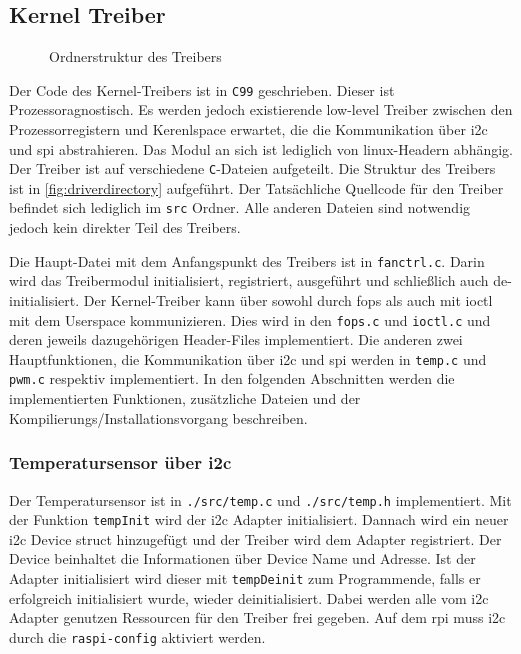 \subsection{Kernel Treiber}

\begin{wrapfigure}[23]{o}[1cm]{8cm}
\caption{Ordnerstruktur des Treibers}
\label{fig:driverdirectory}
\end{wrapfigure}

Der Code des Kernel-Treibers ist in \texttt{C99} geschrieben.
Dieser ist Prozessoragnostisch.
Es werden jedoch existierende low-level Treiber zwischen den Prozessorregistern und Kerenlspace erwartet, die die Kommunikation über \gls{i2c} und \gls{spi} abstrahieren.
Das Modul an sich ist lediglich von linux-Headern abhängig.
Der Treiber ist auf verschiedene \texttt{C}-Dateien aufgeteilt.
Die Struktur des Treibers ist in \autoref{fig:driverdirectory} aufgeführt.
Der Tatsächliche Quellcode für den Treiber befindet sich lediglich im \texttt{src} Ordner.
Alle anderen Dateien sind notwendig jedoch kein direkter Teil des Treibers.

Die Haupt-Datei mit dem Anfangspunkt des Treibers ist in \texttt{fanctrl.c}.
Darin wird das Treibermodul initialisiert, registriert, ausgeführt und schließlich auch de-initialisiert.
Der Kernel-Treiber kann über sowohl durch \gls{fops} als auch mit \gls{ioctl} mit dem Userspace kommunizieren.
Dies wird in den \texttt{fops.c} und \texttt{ioctl.c} und deren jeweils dazugehörigen Header-Files implementiert.
Die anderen zwei Hauptfunktionen, die Kommunikation über \gls{i2c} und \gls{spi} werden in \texttt{temp.c} und \texttt{pwm.c} respektiv implementiert.
In den folgenden Abschnitten werden die implementierten Funktionen, zusätzliche Dateien und der Kompilierungs/Installationsvorgang beschreiben.

\subsubsection{Temperatursensor über \acrshort{i2c}}

Der Temperatursensor ist in \texttt{./src/temp.c} und \texttt{./src/temp.h} implementiert.
Mit der Funktion \texttt{tempInit} wird der \gls{i2c} Adapter initialisiert.
Dannach wird ein neuer \gls{i2c} Device struct hinzugefügt und der Treiber wird dem Adapter registriert.
Der Device beinhaltet die Informationen über Device Name und Adresse.
Ist der Adapter initialisiert wird dieser mit \texttt{tempDeinit} zum Programmende, falls er erfolgreich initialisiert wurde, wieder deinitialisiert.
Dabei werden alle vom \gls{i2c} Adapter genutzen Ressourcen für den Treiber frei gegeben.
Auf dem \gls{rpi} muss \gls{i2c} durch die \texttt{raspi-config} aktiviert werden.

